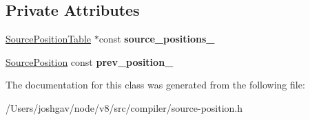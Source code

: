 \subsection*{Private Attributes}
\begin{DoxyCompactItemize}
\item 
\hyperlink{classv8_1_1internal_1_1compiler_1_1_source_position_table}{Source\+Position\+Table} $\ast$const {\bfseries source\+\_\+positions\+\_\+}\hypertarget{classv8_1_1internal_1_1compiler_1_1_source_position_table_1_1_scope_a47bdf6625257c5fb75b689961d09a401}{}\label{classv8_1_1internal_1_1compiler_1_1_source_position_table_1_1_scope_a47bdf6625257c5fb75b689961d09a401}

\item 
\hyperlink{classv8_1_1internal_1_1compiler_1_1_source_position}{Source\+Position} const {\bfseries prev\+\_\+position\+\_\+}\hypertarget{classv8_1_1internal_1_1compiler_1_1_source_position_table_1_1_scope_a75f1e2a71cc6696c582ce4c285ec4431}{}\label{classv8_1_1internal_1_1compiler_1_1_source_position_table_1_1_scope_a75f1e2a71cc6696c582ce4c285ec4431}

\end{DoxyCompactItemize}


The documentation for this class was generated from the following file\+:\begin{DoxyCompactItemize}
\item 
/\+Users/joshgav/node/v8/src/compiler/source-\/position.\+h\end{DoxyCompactItemize}
